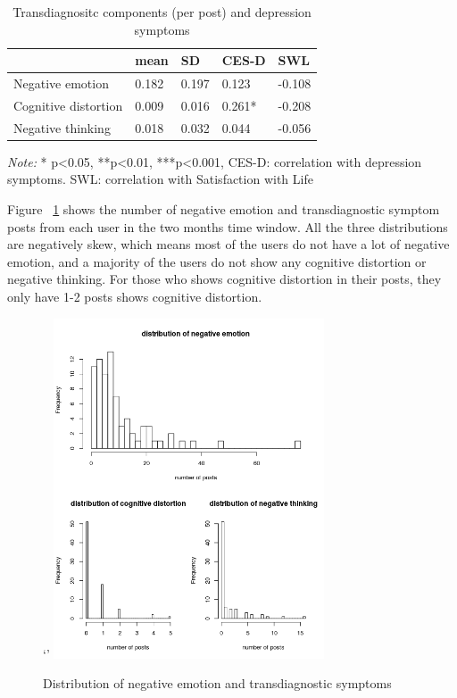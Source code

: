 \begin{table}%
\caption{Transdiagnositc components (per post) and depression symptoms}
\label{tab:one2}
\begin{minipage}{\columnwidth}
\begin{center}
\begin{tabular}{lllll}
  \toprule
        & mean	& SD   &  CES-D  & SWL\\ 
  \hline\hline
  Negative emotion  & 0.182 & 0.197 &0.123 & -0.108\\
  Cognitive distortion  & 0.009 & 0.016 &0.261*& -0.208\\
  Negative thinking  & 0.018 & 0.032 &0.044 & -0.056\\

  \bottomrule
\end{tabular}
\end{center}
\bigskip\centering

 \emph{Note:} * p<0.05, **p<0.01, ***p<0.001, CES-D: correlation with depression symptoms. SWL: correlation with Satisfaction with Life
\end{minipage}
\end{table}%


Figure ~\ref{fig:one} shows the number of negative emotion and transdiagnostic symptom posts from each user in the two months time window. All the three distributions are negatively skew, which means most of the users do not have a lot of negative emotion, and a majority of the users do not show any cognitive distortion or negative thinking.  For those who shows cognitive distortion in their posts, they only have 1-2 posts shows cognitive distortion. 

\begin{figure}`'
  \includegraphics[width=80mm,scale=0.8]{fig1}
  \caption{Distribution of negative emotion and transdiagnostic symptoms}
  \label{fig:one}
\end{figure}

